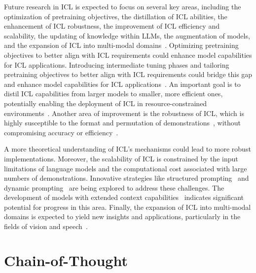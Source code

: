 Future research in ICL is expected to focus on several key areas, including the optimization of pretraining objectives, the distillation of ICL abilities, the enhancement of ICL robustness, the improvement of ICL efficiency and scalability, the updating of knowledge within LLMs, the augmentation of models, and the expansion of ICL into multi-modal domains~\cite{dong2023survey}.
Optimizing pretraining objectives to better align with ICL requirements could enhance model capabilities for ICL applications.
Introducing intermediate tuning phases and tailoring pretraining objectives to better align with ICL requirements could bridge this gap and enhance model capabilities for ICL applications~\cite{shin2022effect}.
An important goal is to distil ICL capabilities from larger models to smaller, more efficient ones, potentially enabling the deployment of ICL in resource-constrained environments~\cite{magister2022teaching}.
Another area of improvement is the robustness of ICL, which is highly susceptible to the format and permutation of demonstrations~\cite{zhao2021calibrate, lu2022fantastically}, without compromising accuracy or efficiency~\cite{chen2024relation}.

A more theoretical understanding of ICL's mechanisms could lead to more robust implementations.
Moreover, the scalability of ICL is constrained by the input limitations of language models and the computational cost associated with large numbers of demonstrations.
Innovative strategies like structured prompting~\cite{hao2022structured} and dynamic prompting~\cite{wang2023efficient} are being explored to address these challenges.
The development of models with extended context capabilities~\cite{li2023contextual} indicates significant potential for progress in this area.
Finally, the expansion of ICL into multi-modal domains is expected to yield new insights and applications, particularly in the fields of vision and speech~\cite{dong2023survey}.


\section{Chain-of-Thought}
\label{sec:chain-of-thought}

